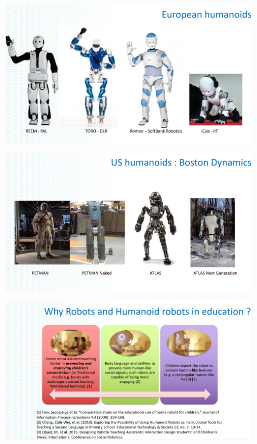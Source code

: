 \documentclass[xetex,mathserif,serif]{beamer}
\begin{document}
	\begin{frame}
		\begin{center}
			\includegraphics[width=\textwidth]{gelin4.png}
		\end{center}
	\end{frame}

	\begin{frame}
		\begin{center}
			\includegraphics[width=\textwidth]{gelin5.png}
		\end{center}
	\end{frame}

	\begin{frame}
		\begin{center}
			\includegraphics[width=\textwidth]{gelin6.png}
		\end{center}
	\end{frame}
\end{document}
